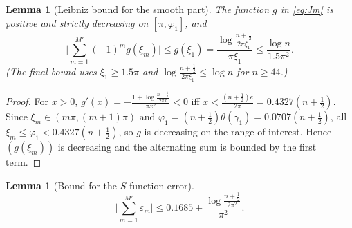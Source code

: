 \documentclass[11pt]{article}
\newtheorem{lemma}[theorem]{Lemma}
\begin{document}
\begin{lemma}[Leibniz bound for the smooth part]
\label{lem:leibniz}
The function $g$ in \eqref{eq:Jm} is positive and strictly decreasing on
$[\pi,\varphi_1]$, and
\begin{equation}\label{eq:leibniz}
\Big|\sum_{m=1}^{M'}(-1)^m g(\xi_m)\Big|\le g(\xi_1)
=\frac{\log\frac{n+\frac12}{2\pi\xi_1}}{\pi\xi_1}
\le\frac{\log n}{1.5\pi^2}.
\end{equation}
(The final bound uses $\xi_1\ge1.5\pi$ and $\log\frac{n+\frac12}{2\pi\xi_1}\le\log n$ for $n\ge44$.)
\end{lemma}

\begin{proof}
For $x>0$, $g'(x)=-\frac{1+\log\frac{n+\frac12}{2\pi x}}{\pi x^2}<0$ iff
$x<\frac{(n+\frac12)e}{2\pi}=0.4327(n+\tfrac12)$. Since
$\xi_m\in(m\pi,(m+1)\pi)$ and $\varphi_1=(n+\tfrac12)\theta(\gamma_1)=0.0707(n+\tfrac12)$,
all $\xi_m\le\varphi_1<0.4327(n+\tfrac12)$, so $g$ is decreasing on the range of interest.
Hence $(g(\xi_m))$ is decreasing and the alternating sum is bounded by the first term.
\end{proof}

\begin{lemma}[Bound for the $S$-function error]
\label{lem:eps}
\begin{equation}\label{eq:eps}
\Big|\sum_{m=1}^{M'}\varepsilon_m\Big|\le 0.1685+\frac{\log\frac{n+\frac12}{2\pi^2}}{\pi^2}.
\end{equation}
\end{lemma}
\end{document}
